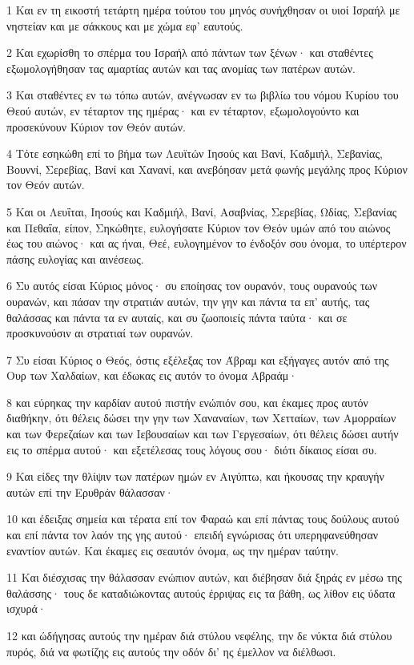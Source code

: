 \par 1 Και εν τη εικοστή τετάρτη ημέρα τούτου του μηνός συνήχθησαν οι υιοί Ισραήλ με νηστείαν και με σάκκους και με χώμα εφ' εαυτούς.
\par 2 Και εχωρίσθη το σπέρμα του Ισραήλ από πάντων των ξένων· και σταθέντες εξωμολογήθησαν τας αμαρτίας αυτών και τας ανομίας των πατέρων αυτών.
\par 3 Και σταθέντες εν τω τόπω αυτών, ανέγνωσαν εν τω βιβλίω του νόμου Κυρίου του Θεού αυτών, εν τέταρτον της ημέρας· και εν τέταρτον, εξωμολογούντο και προσεκύνουν Κύριον τον Θεόν αυτών.
\par 4 Τότε εσηκώθη επί το βήμα των Λευϊτών Ιησούς και Βανί, Καδμιήλ, Σεβανίας, Βουννί, Σερεβίας, Βανί και Χανανί, και ανεβόησαν μετά φωνής μεγάλης προς Κύριον τον Θεόν αυτών.
\par 5 Και οι Λευΐται, Ιησούς και Καδμιήλ, Βανί, Ασαβνίας, Σερεβίας, Ωδίας, Σεβανίας και Πεθαΐα, είπον, Σηκώθητε, ευλογήσατε Κύριον τον Θεόν υμών από του αιώνος έως του αιώνος· και ας ήναι, Θεέ, ευλογημένον το ένδοξόν σου όνομα, το υπέρτερον πάσης ευλογίας και αινέσεως.
\par 6 Συ αυτός είσαι Κύριος μόνος· συ εποίησας τον ουρανόν, τους ουρανούς των ουρανών, και πάσαν την στρατιάν αυτών, την γην και πάντα τα επ' αυτής, τας θαλάσσας και πάντα τα εν αυταίς, και συ ζωοποιείς πάντα ταύτα· και σε προσκυνούσιν αι στρατιαί των ουρανών.
\par 7 Συ είσαι Κύριος ο Θεός, όστις εξέλεξας τον Άβραμ και εξήγαγες αυτόν από της Ουρ των Χαλδαίων, και έδωκας εις αυτόν το όνομα Αβραάμ·
\par 8 και εύρηκας την καρδίαν αυτού πιστήν ενώπιόν σου, και έκαμες προς αυτόν διαθήκην, ότι θέλεις δώσει την γην των Χαναναίων, των Χετταίων, των Αμορραίων και των Φερεζαίων και των Ιεβουσαίων και των Γεργεσαίων, ότι θέλεις δώσει αυτήν εις το σπέρμα αυτού· και εξετέλεσας τους λόγους σου· διότι δίκαιος είσαι συ.
\par 9 Και είδες την θλίψιν των πατέρων ημών εν Αιγύπτω, και ήκουσας την κραυγήν αυτών επί την Ερυθράν θάλασσαν·
\par 10 και έδειξας σημεία και τέρατα επί τον Φαραώ και επί πάντας τους δούλους αυτού και επί πάντα τον λαόν της γης αυτού· επειδή εγνώρισας ότι υπερηφανεύθησαν εναντίον αυτών. Και έκαμες εις σεαυτόν όνομα, ως την ημέραν ταύτην.
\par 11 Και διέσχισας την θάλασσαν ενώπιον αυτών, και διέβησαν διά ξηράς εν μέσω της θαλάσσης· τους δε καταδιώκοντας αυτούς έρριψας εις τα βάθη, ως λίθον εις ύδατα ισχυρά·
\par 12 και ώδήγησας αυτούς την ημέραν διά στύλου νεφέλης, την δε νύκτα διά στύλου πυρός, διά να φωτίζης εις αυτούς την οδόν δι' ης έμελλον να διέλθωσι.
